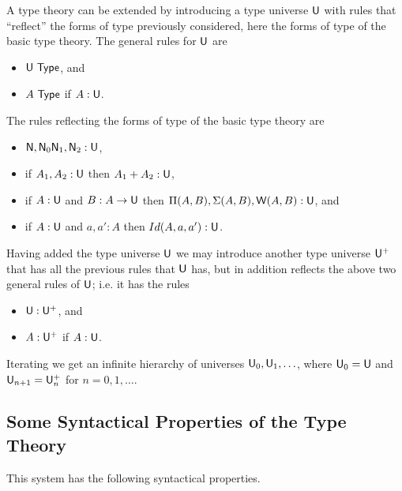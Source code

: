  A type theory can be extended by introducing a type universe ${\sf U}$ with rules that ``reflect'' the forms of type previously considered, here the forms of type of the basic type theory.  The general rules for ${\sf U}$ are

\begin{itemize}
\item ${\sf U}~{\sf Type}$, and
\item $A~{\sf Type}$ if $A:{\sf U}$.
\end{itemize}

The rules reflecting the forms of type of the basic type theory are

\begin{itemize}
\item ${\sf N},{\sf N}_0{\sf N}_1,{\sf N}_2:{\sf U}$,
\item if $A_1,A_2:{\sf U}$ then $A_1+A_2:{\sf U}$,
\item if $A:{\sf U}$ and $B:A\rightarrow{\sf U}$ then     $\Pi(A,B),\Sigma(A,B),{\sf W}(A,B):{\sf U}$, and 
\item if $A:{\sf U}$ and $a,a':A$ then $Id(A,a,a'):{\sf U}$.
\end{itemize}

Having added the type universe ${\sf U}$ we may introduce another type universe
${\sf U}^+$ that has all the previous rules that ${\sf U}$ has, but in addition reflects the above two general rules of ${\sf U}$; i.e. it has the rules

\medskip

\begin{itemize}
\item ${\sf U}:{\sf U}^+$, and
\item $A:{\sf U}^+$ if $A:{\sf U}$.
\end{itemize}

\medskip

Iterating we get an infinite hierarchy of universes ${\sf U}_0,{\sf U}_1,\ldots$, where
${\sf U}_0={\sf U}$ and ${\sf U}_{n+1}={\sf U}_n^+$ for $n=0,1,\ldots$.

\medskip
\subsection*{Some Syntactical Properties of the Type Theory}
 This system has the following syntactical properties.

